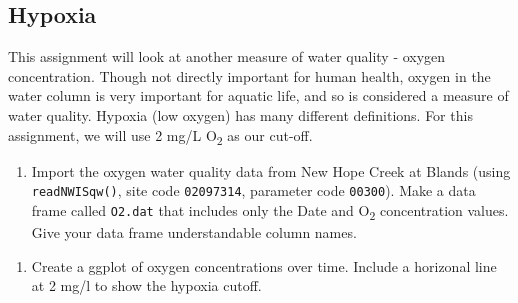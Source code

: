 \documentclass[]{article}
\newenvironment{Shaded}{\begin{snugshade}}{\end{snugshade}}
\newcommand{\DataTypeTok}[1]{\textcolor[rgb]{0.13,0.29,0.53}{#1}}
\newcommand{\DecValTok}[1]{\textcolor[rgb]{0.00,0.00,0.81}{#1}}
\newcommand{\KeywordTok}[1]{\textcolor[rgb]{0.13,0.29,0.53}{\textbf{#1}}}
\newcommand{\NormalTok}[1]{#1}
\newcommand{\OperatorTok}[1]{\textcolor[rgb]{0.81,0.36,0.00}{\textbf{#1}}}
\newcommand{\StringTok}[1]{\textcolor[rgb]{0.31,0.60,0.02}{#1}}
\providecommand{\tightlist}{%
  \setlength{\itemsep}{0pt}\setlength{\parskip}{0pt}}
\begin{document}
\hypertarget{hypoxia}{%
\subsection{Hypoxia}\label{hypoxia}}

This assignment will look at another measure of water quality - oxygen
concentration. Though not directly important for human health, oxygen in
the water column is very important for aquatic life, and so is
considered a measure of water quality. Hypoxia (low oxygen) has many
different definitions. For this assignment, we will use 2 mg/L
O\textsubscript{2} as our cut-off.

\begin{enumerate}
\def\labelenumi{\arabic{enumi}.}
\setcounter{enumi}{3}
\tightlist
\item
  Import the oxygen water quality data from New Hope Creek at Blands
  (using \texttt{readNWISqw()}, site code \texttt{02097314}, parameter
  code \texttt{00300}). Make a data frame called \texttt{O2.dat} that
  includes only the Date and O\textsubscript{2} concentration values.
  Give your data frame understandable column names.
\end{enumerate}

\begin{Shaded}
\end{Shaded}

\begin{enumerate}
\def\labelenumi{\arabic{enumi}.}
\setcounter{enumi}{4}
\tightlist
\item
  Create a ggplot of oxygen concentrations over time. Include a
  horizonal line at 2 mg/l to show the hypoxia cutoff.
\end{enumerate}
\end{document}
